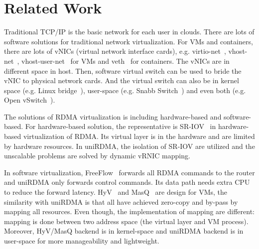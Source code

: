 \section{Related Work}

Traditional TCP/IP is the basic network for each user in clouds. There are lots of software solutions for traditional network virtualization. For VMs and containers, there are lots of vNICs (virtual network interface cards), e.g. virtio-net~\cite{virtio-russell2008}, vhost-net~\cite{vhost-net},  vhost-user-net~\cite{vhost-user-net} for VMs and veth~\cite{veth} for containers. The vNICs are in different space in host. Then, software virtual switch can be used to bride the vNIC to physical network cards. And the virtual switch can also be in kernel space (e.g. Linux bridge~\cite{linux-bridge}), user-space (e.g. Snabb Switch~\cite{snabb}) and even both (e.g. Open vSwitch~\cite{ovs-2015}).  

The solutions of RDMA virtualization is including hardware-based and software-based. For hardware-based solution, the representative is SR-IOV~\cite{sr-iov} in hardware-based virtualization of RDMA. Its virtual layer is in the hardware and are limited by hardware resources. In uniRDMA, the isolation of SR-IOV are utilized and the unscalable problems are solved by dynamic vRNIC mapping. 

In software virtualization, FreeFlow~\cite{kim2019freeflow} forwards all RDMA commands to the router and uniRDMA only forwards control commands. Its data path needs extra CPU to reduce the forward latency. HyV~\cite{pfefferle2015hybrid} and MasQ~\cite{he2020masq} are design for VMs, the similarity with uniRDMA is that all have achieved zero-copy and by-pass by mapping all resources. Even though, the implementation of mapping are different: mapping is done between two address space (the virtual layer and VM process). Moreover, HyV/MasQ backend is in kernel-space and uniRDMA backend is in user-space for more manageability and lightweight.